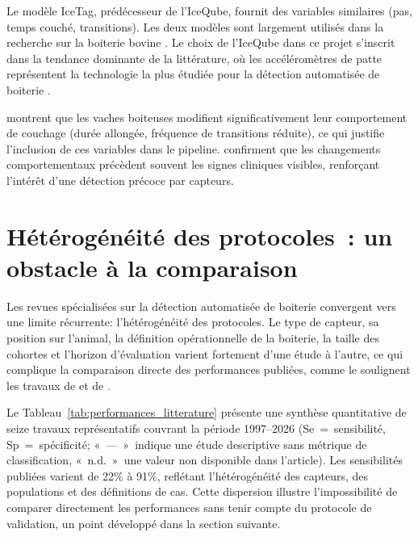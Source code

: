 Le modèle IceTag, prédécesseur de l'IceQube, fournit des variables similaires (pas, temps
couché, transitions). Les deux modèles sont largement utilisés dans la recherche sur la
boiterie bovine \citep{beer2016objective,alsaaod2012electronic}. Le choix de l'IceQube
dans ce projet s'inscrit dans la tendance dominante de la littérature, où les
accéléromètres de patte représentent la technologie la plus étudiée pour la détection
automatisée de boiterie \citep{oleary2020accelerometers,bewley2008review}.

\cite{ito2010lying} montrent que les vaches boiteuses modifient significativement leur
comportement de couchage (durée allongée, fréquence de transitions réduite), ce qui
justifie l'inclusion de ces variables dans le pipeline. \cite{nechanitzky2016analysis}
confirment que les changements comportementaux précèdent souvent les signes cliniques
visibles, renforçant l'intérêt d'une détection précoce par capteurs.

\section{Hétérogénéité des protocoles~: un obstacle à la comparaison}

Les revues spécialisées sur la détection automatisée de boiterie convergent vers une
limite récurrente: l'hétérogénéité des protocoles. Le type de capteur, sa position sur
l'animal, la définition opérationnelle de la boiterie, la taille des cohortes et l'horizon
d'évaluation varient fortement d'une étude à l'autre, ce qui complique la comparaison
directe des performances publiées, comme le soulignent les travaux de
\citet{oleary2020accelerometers} et de \citet{alsaaod2019automatic}.

Le Tableau~\ref{tab:performances_litterature} présente une synthèse quantitative de seize
travaux représentatifs couvrant la période 1997--2026 (Se~=~sensibilité, Sp~=~spécificité;
«~\textnormal{—}~»~indique une étude descriptive sans métrique de classification,
«~\textnormal{n.d.}~»~une valeur non disponible dans l'article). Les sensibilités publiées
varient de 22\% à 91\%, reflétant l'hétérogénéité des capteurs, des populations et des
définitions de cas. Cette dispersion illustre l'impossibilité de comparer directement les
performances sans tenir compte du protocole de validation, un point développé dans la
section suivante.

